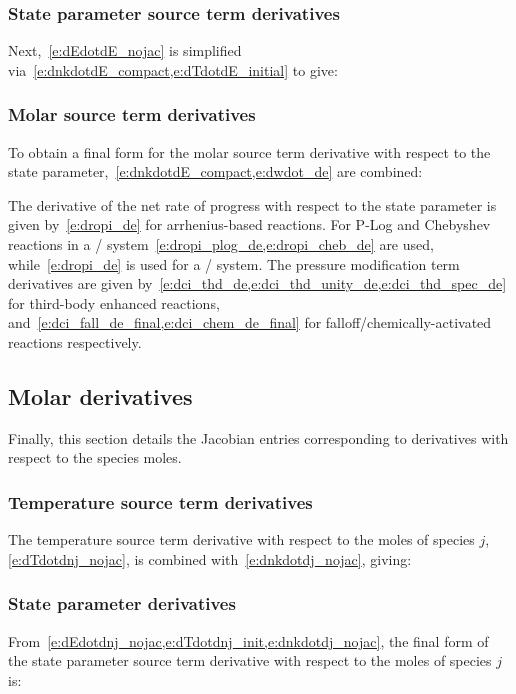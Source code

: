 \documentclass[12pt,number,sort&compress]{elsarticle}
\begin{document}
\subsubsection{State parameter source term derivatives}
Next,~\cref{e:dEdotdE_nojac} is simplified via~\cref{e:dnkdotdE_compact,e:dTdotdE_initial} to give:

\subsubsection{Molar source term derivatives}
To obtain a final form for the molar source term derivative with respect to the state parameter,~\cref{e:dnkdotdE_compact,e:dwdot_de} are combined:

The derivative of the net rate of progress with respect to the state parameter is given by~\cref{e:dropi_de} for arrhenius-based reactions.
For P-Log and Chebyshev reactions in a \conv/ system~\cref{e:dropi_plog_de,e:dropi_cheb_de} are used, while~\cref{e:dropi_de} is used for a \conp/ system.
The pressure modification term derivatives are given by~\cref{e:dci_thd_de,e:dci_thd_unity_de,e:dci_thd_spec_de} for third-body enhanced reactions, and~\cref{e:dci_fall_de_final,e:dci_chem_de_final} for falloff\slash chemically-activated reactions respectively.

\subsection{Molar derivatives}
Finally, this section details the Jacobian entries corresponding to derivatives with respect to the species moles.

\subsubsection{Temperature source term derivatives}
The temperature source term derivative with respect to the moles of species $j$, \cref{e:dTdotdnj_nojac}, is combined with~\cref{e:dnkdotdj_nojac}, giving:

\subsubsection{State parameter derivatives}
From~\cref{e:dEdotdnj_nojac,e:dTdotdnj_init,e:dnkdotdj_nojac}, the final form of the state parameter source term derivative with respect to the moles of species $j$ is:
\end{document}
